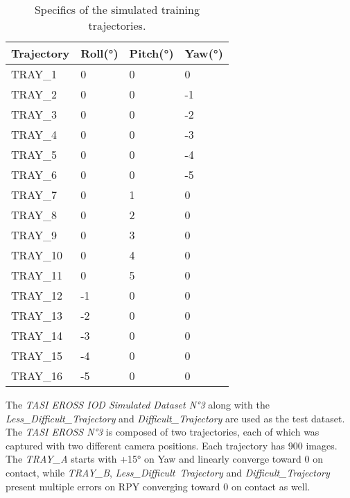 \begin{table}[H]
\caption{Specifics of the simulated training trajectories.}
\label{tab:trajectories}
\centering
\begin{tabular}{l | l l l}
\toprule
Trajectory & Roll(°) & Pitch(°) & Yaw(°)\\
\midrule
TRAY\_1 & 0 & 0 & 0\\
TRAY\_2 & 0 & 0 & -1\\
TRAY\_3 & 0 & 0 & -2\\
TRAY\_4 & 0 & 0 & -3\\
TRAY\_5 & 0 & 0 & -4\\
TRAY\_6 & 0 & 0 & -5\\
TRAY\_7 & 0 & 1 & 0\\
TRAY\_8 & 0 & 2 & 0\\
TRAY\_9 & 0 & 3 & 0\\
TRAY\_10 & 0 & 4 & 0\\
TRAY\_11 & 0 & 5 & 0\\
TRAY\_12 & -1 & 0 & 0\\
TRAY\_13 & -2 & 0 & 0\\
TRAY\_14 & -3 & 0 & 0\\
TRAY\_15 & -4 & 0 & 0\\
TRAY\_16 & -5 & 0 & 0\\
\bottomrule
\end{tabular}
\end{table}

The \textit{TASI EROSS IOD Simulated Dataset N°3} along with the \textit{Less\_Difficult\_Trajectory} and \textit{Difficult\_Trajectory} are used as the test dataset. The \textit{TASI EROSS N°3} is composed of two trajectories, each of which was captured with two different camera positions. Each trajectory has 900 images.\\
The \textit{TRAY\_A} starts with +15° on Yaw and linearly converge toward 0 on contact, while \textit{TRAY\_B}, \textit{Less\_Difficult\ Trajectory} and \textit{Difficult\_Trajectory} present multiple errors on RPY converging toward 0 on contact as well.
